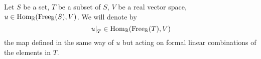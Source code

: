 \begin{notation}
  Let
    $S$ be a set,
    $T$ be a subset of $S$,
    $V$ be a real vector space,
    $u \in \mathop{\rm Hom}\nolimits_{\mathbb{R}}({\rm Free}_{\mathbb{R}}(S), V)$.
  We will denote by
  \begin{equation}
    \left. u \right|_{T} \in \mathop{\rm Hom}\nolimits_{\mathbb{R}}({\rm Free}_{\mathbb{R}}(T), V)
  \end{equation}
  the map defined in the same way of $u$ but acting on formal linear
  combinations of the elements in $T$.
\end{notation}
